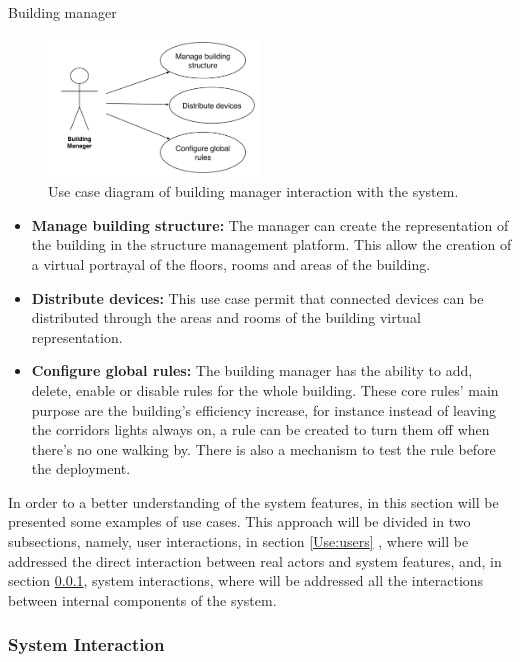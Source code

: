 \begin{Paragraph}{Building manager}
	
	
	\begin{figure}[H]
		\centering
		\includegraphics[width=0.5\textwidth]{figures/usecase2.png}
		\caption{Use case diagram of building manager interaction with the system.}
		\label{fig:manager}
	\end{figure}
\begin{itemize}
	\item{\textbf{Manage building structure:}	The manager can create the representation of the building in the structure management platform. This allow the creation of a virtual portrayal of the floors, rooms and areas of the building.}
	\item{\textbf{Distribute devices:}	This use case permit that connected devices can be distributed through the areas and rooms of the building virtual representation.}
	\item{\textbf{Configure global rules:}	The building manager has the ability to add, delete, enable or disable rules for the whole building. These core rules' main purpose are the building's efficiency increase, for instance instead of leaving the corridors lights always on, a rule can be created to turn them off when there's no one walking by. There is also a mechanism to test the rule before the deployment.}
\end{itemize}
\end{Paragraph}

\iffalse
In order to a better understanding of the system features, in this section will be presented some examples of use cases. This approach will be divided in two subsections, namely, user interactions, in section \ref{Use:users} , where will be addressed the direct interaction between real actors and system features, and, in section \ref{Use:system}, system interactions, where will be addressed all the interactions between internal components of the system.

\subsubsection{System Interaction}
\label{Use:system}

